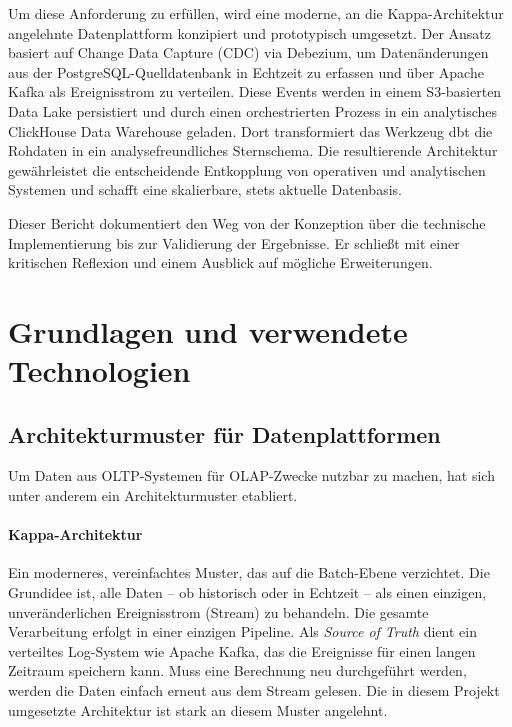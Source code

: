 \documentclass[
    12pt,               
    a4paper,        
    ngerman            
]{scrartcl}
\begin{document}
Um diese Anforderung zu erfüllen, wird eine moderne, an die Kappa-Architektur angelehnte Datenplattform konzipiert und prototypisch umgesetzt. Der Ansatz basiert auf Change Data Capture (CDC) via Debezium, um Datenänderungen aus der PostgreSQL-Quelldatenbank in Echtzeit zu erfassen und über Apache Kafka als Ereignisstrom zu verteilen. Diese Events werden in einem S3-basierten Data Lake persistiert und durch einen orchestrierten Prozess in ein analytisches ClickHouse Data Warehouse geladen. Dort transformiert das Werkzeug dbt die Rohdaten in ein analysefreundliches Sternschema. Die resultierende Architektur gewährleistet die entscheidende Entkopplung von operativen und analytischen Systemen und schafft eine skalierbare, stets aktuelle Datenbasis.

Dieser Bericht dokumentiert den Weg von der Konzeption über die technische Implementierung bis zur Validierung der Ergebnisse. Er schließt mit einer kritischen Reflexion und einem Ausblick auf mögliche Erweiterungen.
\section{Grundlagen und verwendete Technologien}

\subsection{Architekturmuster für Datenplattformen}
\label{sec:architekturmuster}
Um Daten aus OLTP-Systemen für OLAP-Zwecke nutzbar zu machen, hat sich unter anderem ein Architekturmuster etabliert.

\paragraph{Kappa-Architektur} Ein moderneres, vereinfachtes Muster, das auf die Batch-Ebene verzichtet. Die Grundidee ist, alle Daten – ob historisch oder in Echtzeit – als einen einzigen, unveränderlichen Ereignisstrom (Stream) zu behandeln. Die gesamte Verarbeitung erfolgt in einer einzigen Pipeline. Als \textit{Source of Truth} dient ein verteiltes Log-System wie Apache Kafka, das die Ereignisse für einen langen Zeitraum speichern kann. Muss eine Berechnung neu durchgeführt werden, werden die Daten einfach erneut aus dem Stream gelesen. Die in diesem Projekt umgesetzte Architektur ist stark an diesem Muster angelehnt.
\end{document}
